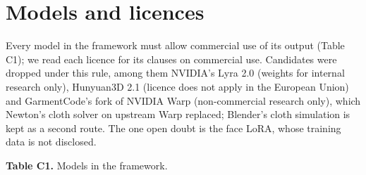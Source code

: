 \section{Models and licences}\label{models-and-licences}

Every model in the framework must allow commercial use of its output (Table C1); we read each licence for its clauses on commercial use. Candidates were dropped under this rule, among them NVIDIA's Lyra 2.0 (weights for internal research only), Hunyuan3D 2.1 (licence does not apply in the European Union) and GarmentCode's fork of NVIDIA Warp (non-commercial research only), which Newton's cloth solver on upstream Warp replaced; Blender's cloth simulation \citep{blender} is kept as a second route. The one open doubt is the face LoRA, whose training data is not disclosed.

\par{}\ifdim\dimexpr\pagegoal-\pagetotal\relax<12\baselineskip\clearpage\fi

\textbf{Table C1.} Models in the framework.

\begingroup\footnotesize\setlength{\tabcolsep}{3pt}

